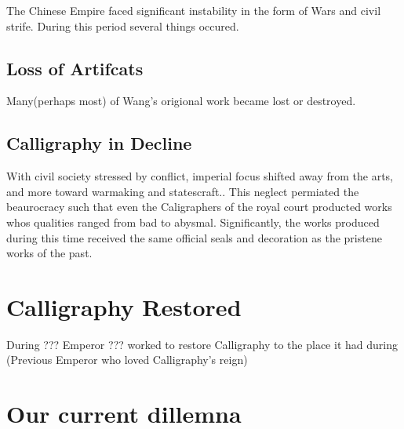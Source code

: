 The Chinese Empire faced significant instability in the form of Wars and civil strife.  During this period several things occured.

\subsection{Loss of Artifcats}

Many(perhaps most) of Wang's origional work became lost or destroyed.

\subsection{Calligraphy in Decline}

With civil society stressed by conflict, imperial focus shifted away from the arts, and more toward warmaking and statescraft..  This neglect permiated the beaurocracy such that even the Caligraphers of the royal court producted works whos qualities ranged from bad to abysmal.  Significantly, the works produced during this time received the same official seals and decoration as the pristene works of the past.

\section{Calligraphy Restored}

During ??? Emperor ??? worked to restore Calligraphy to the place it had during (Previous Emperor who loved Calligraphy's reign)


\section{Our current dillemna}




